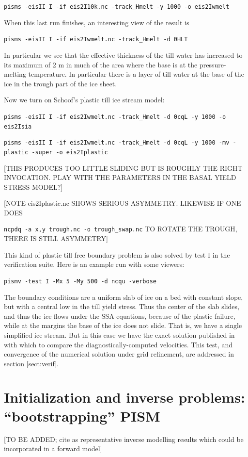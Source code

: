 \documentclass[11pt,final]{amsart}
\begin{document}
\verb|pisms -eisII I -if eis2I10k.nc -track_Hmelt -y 1000 -o eis2Iwmelt|

\noindent When this last run finishes, an interesting view of the result is

\verb|pisms -eisII I -if eis2Iwmelt.nc -track_Hmelt -d 0HLT|

\noindent In particular we see that the effective thickness of the till water has increased to its maximum of 2 m in much of the area where the base is at the pressure-melting temperature.  In particular there is a layer of till water at the base of the ice in the trough part of the ice sheet.

Now we turn on Schoof's plastic till ice stream model:

\verb|pisms -eisII I -if eis2Iwmelt.nc -track_Hmelt -d 0cqL -y 1000 -o eis2Isia|

\verb|pisms -eisII I -if eis2Iwmelt.nc -track_Hmelt -d 0cqL -y 1000 -mv -plastic -super -o eis2Iplastic|


[THIS PRODUCES TOO LITTLE SLIDING BUT IS ROUGHLY THE RIGHT INVOCATION.  PLAY WITH THE PARAMETERS IN THE BASAL YIELD STRESS MODEL?]

[NOTE eis2Iplastic.nc SHOWS SERIOUS ASYMMETRY.  LIKEWISE IF ONE DOES 

\verb|ncpdq -a x,y trough.nc -o trough_swap.nc| TO ROTATE THE TROUGH, THERE IS STILL ASYMMETRY]

This kind of plastic till free boundary problem is also solved by test I in the verification suite.  Here is an example run with some viewers:

\verb|pismv -test I -Mx 5 -My 500 -d ncqu -verbose|

\noindent The boundary conditions are a uniform slab of ice on a bed with constant slope, but with a central low in the till yield stress.  Thus the center of the slab slides, and thus the ice flows under the SSA equations, because of the plastic failure, while at the margins the base of the ice does not slide.  That is, we have a single simplified ice stream.  But in this case we have the exact solution published in \cite{SchoofStream} with which to compare the diagnostically-computed velocities.  This test, and convergence of the numerical solution under grid refinement, are addressed in section \ref{sect:verif}.





\clearpage
\newpage
\section{Initialization and inverse problems: ``bootstrapping'' PISM}\label{sect:boot}  [TO BE ADDED; cite \cite{JoughinMacAyealTulaczyk} as representative inverse modelling results which could be incorporated in a forward model]
\end{document}
